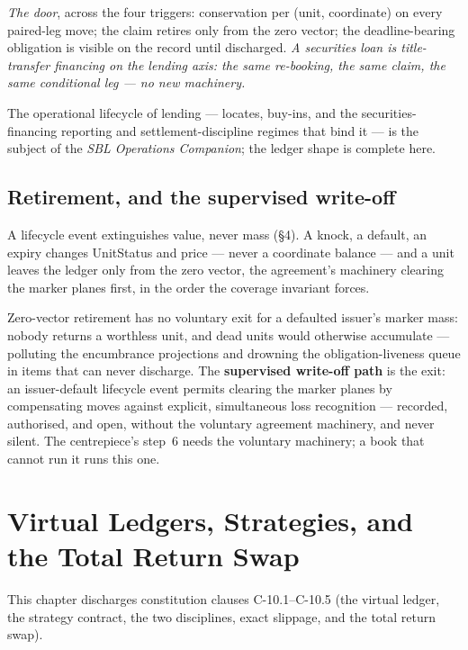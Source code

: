 \documentclass[11pt,a4paper]{article}
\begin{document}
\emph{The door}, across the four triggers: conservation per (unit, coordinate)
on every paired-leg move; the claim retires only from the zero vector; the
deadline-bearing obligation is visible on the record until discharged.
\emph{A securities loan is title-transfer financing on the lending axis: the
same re-booking, the same claim, the same conditional leg --- no new
machinery.}

\medskip
The operational lifecycle of lending --- locates, buy-ins, and the
securities-financing reporting and settlement-discipline regimes that bind it
--- is the subject of the \emph{SBL Operations Companion}; the ledger shape is
complete here.

\subsection{Retirement, and the supervised write-off}

A lifecycle event extinguishes value, never mass (\S4). A knock, a default, an
expiry changes UnitStatus and price --- never a coordinate balance --- and a
unit leaves the ledger only from the zero vector, the agreement's machinery
clearing the marker planes first, in the order the coverage invariant forces.

Zero-vector retirement has no voluntary exit for a defaulted issuer's marker
mass: nobody returns a worthless unit, and dead units would otherwise
accumulate --- polluting the encumbrance projections and drowning the
obligation-liveness queue in items that can never discharge. The
\textbf{supervised write-off path} is the exit: an issuer-default lifecycle
event permits clearing the marker planes by compensating moves against
explicit, simultaneous loss recognition --- recorded, authorised, and open,
without the voluntary agreement machinery, and never silent. The centrepiece's
step~6 needs the voluntary machinery; a book that cannot run it runs this one.

\section{Virtual Ledgers, Strategies, and the Total Return Swap}
\label{ch:virtual}

This chapter discharges constitution clauses C-10.1--C-10.5 (the virtual ledger, the strategy contract, the two disciplines, exact slippage, and the total return swap).
\end{document}
